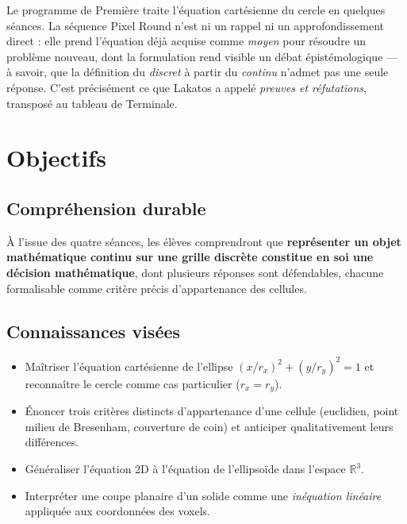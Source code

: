 \documentclass[12pt,a4paper]{scrartcl}
\newcommand{\acc}[1]{\textcolor{accent}{\textbf{#1}}}
\begin{document}
\begin{note}
Le programme de Première traite l'équation cartésienne du cercle en quelques séances. La séquence Pixel Round n'est ni un rappel ni un approfondissement direct : elle prend l'équation déjà acquise comme \emph{moyen} pour résoudre un problème nouveau, dont la formulation rend visible un débat épistémologique --- à savoir, que la définition du \emph{discret} à partir du \emph{continu} n'admet pas une seule réponse. C'est précisément ce que Lakatos a appelé \emph{preuves et réfutations}, transposé au tableau de Terminale.
\end{note}

\section{Objectifs}

\subsection{Compréhension durable}

À l'issue des quatre séances, les élèves comprendront que \acc{représenter un objet mathématique continu sur une grille discrète constitue en soi une décision mathématique}, dont plusieurs réponses sont défendables, chacune formalisable comme critère précis d'appartenance des cellules.

\subsection{Connaissances visées}

\begin{itemize}[leftmargin=1.3em,itemsep=0.15em,topsep=0.3em]
  \item Maîtriser l'équation cartésienne de l'ellipse $(x/r_x)^2 + (y/r_y)^2 = 1$ et reconnaître le cercle comme cas particulier ($r_x = r_y$).
  \item Énoncer trois critères distincts d'appartenance d'une cellule (euclidien, point milieu de Bresenham, couverture de coin) et anticiper qualitativement leurs différences.
  \item Généraliser l'équation 2D à l'équation de l'ellipsoïde dans l'espace $\mathbb{R}^3$.
  \item Interpréter une coupe planaire d'un solide comme une \emph{inéquation linéaire} appliquée aux coordonnées des voxels.
\end{itemize}
\end{document}
